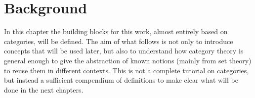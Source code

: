 \chapter{Background}

In this chapter the building blocks for this work, almost entirely based on categories, will be defined.
The aim of what follows is not only to introduce concepts that will be used later, but also to understand how category theory is general enough to give the abstraction of known notions (mainly from set theory) to reuse them in different contexts. This is not a complete tutorial on categories, but instead a sufficient compendium of definitions to make clear what will be done in the next chapters.




